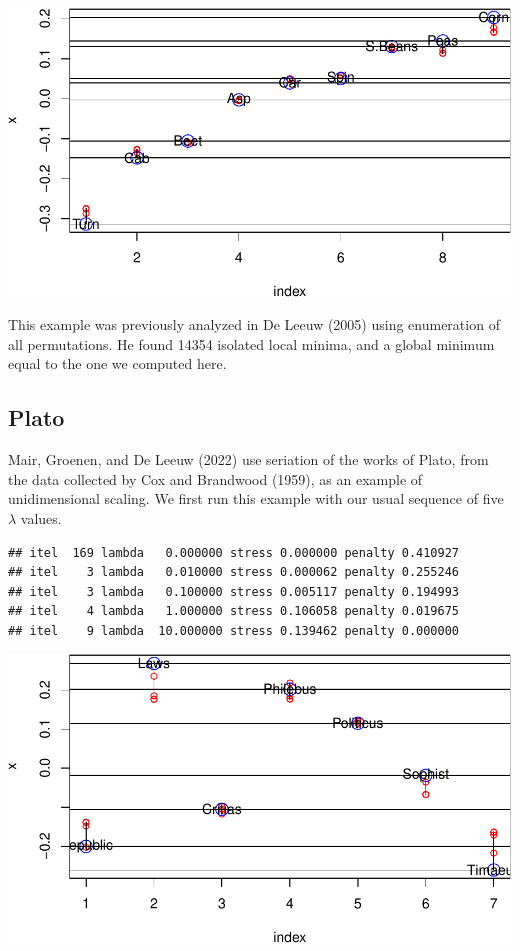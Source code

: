 \documentclass[
  12pt,
]{article}
\begin{document}
\begin{center}\includegraphics{penalty_files/figure-latex/veg-1} \end{center}

This example was previously analyzed in De Leeuw (2005) using
enumeration of all permutations. He found 14354 isolated local minima,
and a global minimum equal to the one we computed here.

\hypertarget{plato}{%
\subsection{Plato}\label{plato}}

Mair, Groenen, and De Leeuw (2022) use seriation of the works of Plato,
from the data collected by Cox and Brandwood (1959), as an example of
unidimensional scaling. We first run this example with our usual
sequence of five \(\lambda\) values.

\begin{verbatim}
## itel  169 lambda   0.000000 stress 0.000000 penalty 0.410927 
## itel    3 lambda   0.010000 stress 0.000062 penalty 0.255246 
## itel    3 lambda   0.100000 stress 0.005117 penalty 0.194993 
## itel    4 lambda   1.000000 stress 0.106058 penalty 0.019675 
## itel    9 lambda  10.000000 stress 0.139462 penalty 0.000000
\end{verbatim}

\begin{center}\includegraphics{penalty_files/figure-latex/plato-1} \end{center}
\end{document}
